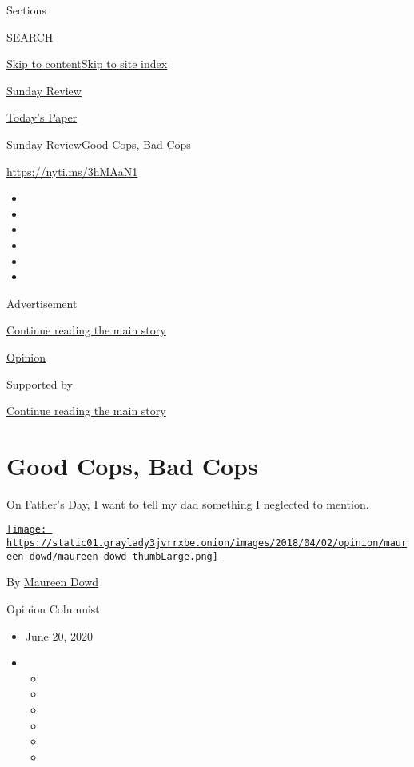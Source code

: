 Sections

SEARCH

\protect\hyperlink{site-content}{Skip to
content}\protect\hyperlink{site-index}{Skip to site index}

\href{https://www.nytimes3xbfgragh.onion/section/opinion/sunday}{Sunday
Review}

\href{https://myaccount.nytimes3xbfgragh.onion/auth/login?response_type=cookie\&client_id=vi}{}

\href{https://www.nytimes3xbfgragh.onion/section/todayspaper}{Today's
Paper}

\href{/section/opinion/sunday}{Sunday Review}\textbar{}Good Cops, Bad
Cops

\url{https://nyti.ms/3hMAaN1}

\begin{itemize}
\item
\item
\item
\item
\item
\item
\end{itemize}

Advertisement

\protect\hyperlink{after-top}{Continue reading the main story}

\href{/section/opinion}{Opinion}

Supported by

\protect\hyperlink{after-sponsor}{Continue reading the main story}

\hypertarget{good-cops-bad-cops}{%
\section{Good Cops, Bad Cops}\label{good-cops-bad-cops}}

On Father's Day, I want to tell my dad something I neglected to mention.

\href{https://www.nytimes3xbfgragh.onion/by/maureen-dowd}{\texttt{[image: https://static01.graylady3jvrrxbe.onion/images/2018/04/02/opinion/maureen-dowd/maureen-dowd-thumbLarge.png]}}

By \href{https://www.nytimes3xbfgragh.onion/by/maureen-dowd}{Maureen
Dowd}

Opinion Columnist

\begin{itemize}
\item
  June 20, 2020
\item
  \begin{itemize}
  \item
  \item
  \item
  \item
  \item
  \item
  \end{itemize}
\end{itemize}

